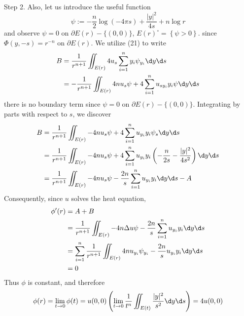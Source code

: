\begin{theorem}
    Step 2.
    Also, let us introduce the useful function
    \begin{equation*}
        \psi:=-\frac{n}{2} \log (-4 \pi s)+\frac{|y|^2}{4 s}+n \log r
    \end{equation*}
    and observe $\psi=0$ on $\partial E(r)-\{(0,0)\}$,
    $E(r)^\circ =\left\{\psi >0 \right\}$.
    since $\Phi(y,-s)=r^{-n}$ on $\partial E(r)$. We utilize (21) to write
    \begin{equation*}
        \begin{aligned}
            B & =\frac{1}{r^{n+1}} \iint_{E(r)} 4 u_s \sum_{i=1}^n y_i \psi_{y_i} \d y \d s               \\
              & =-\frac{1}{r^{n+1}} \iint_{E(r)} 4 n u_s \psi+4 \sum_{i=1}^n u_{s y_i} y_i \psi \d y \d s
        \end{aligned}
    \end{equation*}
    there is no boundary term since $\psi=0$ on $\partial E(r)-\{(0,0)\}$. Integrating by parts with respect to $s$, we discover
    \begin{equation*}
        \begin{aligned}
            B & =\frac{1}{r^{n+1}} \iint_{E(r)}-4 n u_s \psi+4 \sum_{i=1}^n u_{y_i} y_i \psi_s \d y \d s                                         \\
              & =\frac{1}{r^{n+1}} \iint_{E(r)}-4 n u_s \psi+4 \sum_{i=1}^n u_{y_i} y_i\left(-\frac{n}{2 s}-\frac{|y|^2}{4 s^2}\right) \d y \d s \\
              & =\frac{1}{r^{n+1}} \iint_{E(r)}-4 n u_s \psi-\frac{2 n}{s} \sum_{i=1}^n u_{y_i} y_i \d y \d s-A
        \end{aligned}
    \end{equation*}
    Consequently, since $u$ solves the heat equation,
    \begin{equation*}
        \begin{aligned}
            \phi^{\prime}(r) & =A+B                                                                                                    \\
                             & =\frac{1}{r^{n+1}} \iint_{E(r)}-4 n \Delta u \psi-\frac{2 n}{s} \sum_{i=1}^n u_{y_i} y_i \d y \d s      \\
                             & =\sum_{i=1}^n \frac{1}{r^{n+1}} \iint_{E(r)} 4 n u_{y_i} \psi_{y_i}-\frac{2 n}{s} u_{y_i} y_i \d y \d s \\
                             & =0
        \end{aligned}
    \end{equation*}
    Thus $\phi$ is constant, and therefore
    \begin{equation*}
        \phi(r)=\lim _{t \rightarrow 0} \phi(t)=u(0,0)\left(\lim _{t \rightarrow 0} \frac{1}{t^n} \iint_{E(t)} \frac{|y|^2}{s^2} \d y \d s\right)=4 u(0,0)
    \end{equation*}
\end{theorem}

